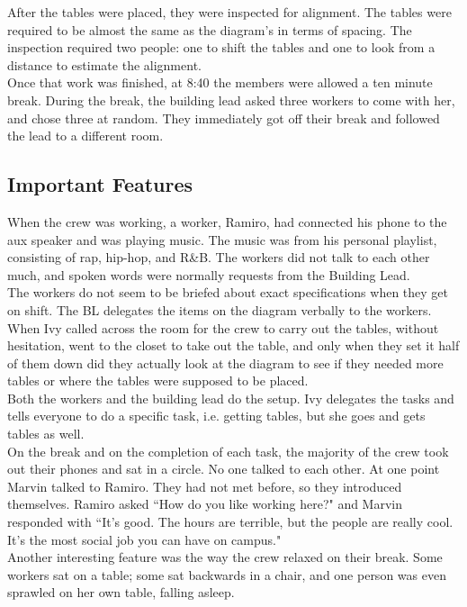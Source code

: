 \documentclass[letterpaper, 12pt]{report}
\begin{document}
After the tables were placed, they were inspected for alignment. The tables were required to be almost the same as the diagram's in terms of spacing. The inspection required two people: one to shift the tables and one to look from a distance to estimate the alignment.\\

Once that work was finished, at 8:40 the members were allowed a ten minute break. During the break, the building lead asked three workers to come with her, and chose three at random. They immediately got off their break and followed the lead to a different room.
\subsection{Important Features}
When the crew was working, a worker, Ramiro, had connected his phone to the aux speaker and was playing music. The music was from his personal playlist, consisting of rap, hip-hop, and R\&B. The workers did not talk to each other much, and spoken words were normally requests from the Building Lead.\\

The workers do not seem to be briefed about exact specifications when they get on shift. The BL delegates the items on the diagram verbally to the workers. When Ivy called across the room for the crew to carry out the tables, without hesitation, went to the closet to take out the table, and only when they set it half of them down did they actually look at the diagram to see if they needed more tables or where the tables were supposed to be placed.\\

Both the workers and the building lead do the setup. Ivy delegates the tasks and tells everyone to do a specific task, i.e. getting tables, but she goes and gets tables as well.\\

On the break and on the completion of each task, the majority of the crew took out their phones and sat in a circle. No one talked to each other. At one point Marvin talked to Ramiro. They had not met before, so they introduced themselves. Ramiro asked ``How do you like working here?" and Marvin responded with ``It's good. The hours are terrible, but the people are really cool. It's the most social job you can have on campus."\\

Another interesting feature was the way the crew relaxed on their break. Some workers sat on a table; some sat backwards in a chair, and one person was even sprawled on her own table, falling asleep.
\end{document}
